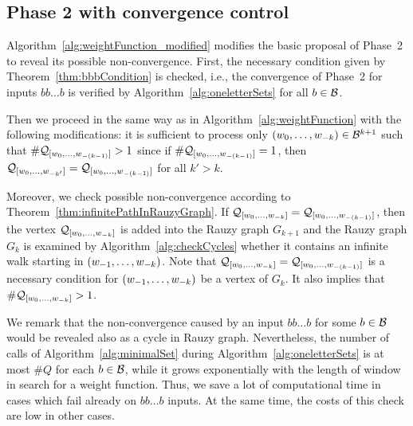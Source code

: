 \subsection*{Phase 2 with convergence control}
Algorithm~\ref{alg:weightFunction_modified} modifies the basic proposal of Phase~2 to reveal its possible non-convergence. First, the necessary condition given by Theorem~\ref{thm:bbbCondition} is checked, i.e., the convergence of Phase~2 for inputs $bb\dots b$ is verified by Algorithm~\ref{alg:oneletterSets} for all $b\in\mathcal{B}$. 

Then we proceed in the same way as in Algorithm~\ref{alg:weightFunction} with the following modifications: it is sufficient to process only $(w_{0}, \dots, w_{-k}) \in \mathcal{B}^{k+1}$ such that $\#\mathcal{Q}_{[w_{0}, \dots, w_{-(k-1)}]}>1$ since if $\#\mathcal{Q}_{[w_{0}, \dots, w_{-(k-1)}]}=1$, then $\mathcal{Q}_{[w_{0}, \dots, w_{-k'}]}=\mathcal{Q}_{[w_{0}, \dots, w_{-(k-1)}]}$ for all $k'>k$. 

Moreover, we check possible non-convergence according to Theorem~\ref{thm:infinitePathInRauzyGraph}. If $\mathcal{Q}_{[w_{0}, \dots, w_{-k}]} = \mathcal{Q}_{[w_{0}, \dots, w_{-(k-1)}]}$, then the vertex $\mathcal{Q}_{[w_{0}, \dots, w_{-k}]}$ is added into the Rauzy graph $G_{k+1}$ and the Rauzy graph $G_k$ is examined by Algorithm~\ref{alg:checkCycles} whether it contains an infinite walk starting in $(w_{-1}, \dots, w_{-k})$. Note that $\mathcal{Q}_{[w_{0}, \dots, w_{-k}]} = \mathcal{Q}_{[w_{0}, \dots, w_{-(k-1)}]}$ is a necessary condition for $(w_{-1}, \dots, w_{-k})$ be a vertex of $G_k$. It also implies that $\#\mathcal{Q}_{[w_{0}, \dots, w_{-k}]}>1$.

We remark that the non-convergence caused by an input $bb\dots b$ for some $b\in\mathcal{B}$ would be revealed also as a cycle in Rauzy graph. Nevertheless, the number of calls of Algorithm~\ref{alg:minimalSet} during Algorithm~\ref{alg:oneletterSets} is at most $\#Q$ for each $b\in\mathcal{B}$, while it grows exponentially with the length of window in search for a weight function. Thus, we save a lot of computational time in cases which fail already on $bb\dots b$ inputs. At the same time, the costs of this check are low in other cases.

